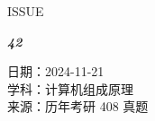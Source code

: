 \documentclass[UTF8]{ctexart}
\newcommand\Black[1]{\textcolor[gray]{0.3}{#1}}
\newcommand\Brown[1]{\textcolor[HTML]{998A4E}{#1}}
\newcommand\IssueNumber{42}
\newcommand\Date{2024-11-21}
\newcommand\Subject{计算机组成原理}
\newcommand\Source{历年考研 408 真题}
\begin{document}
\begin{figure}[H]
\hspace{1cm}
\begin{minipage}[t]{0.3\textwidth}
\centering
    \Brown{\Genshin ISSUE}

    \vspace{-0.6cm}
    \Huge \Issue\slshape\bfseries\Black{\IssueNumber}
\end{minipage}
\hfill
\begin{minipage}[t]{0.35\textwidth}
\centering
    \Brown{日期：\Date} \\
\vspace{-0.1cm}
    \Brown{学科：\Subject} \\
\vspace{-0.1cm}
    \Brown{来源：\Source}
\end{minipage}
\hspace{0.8cm}
\end{figure}
\end{document}
